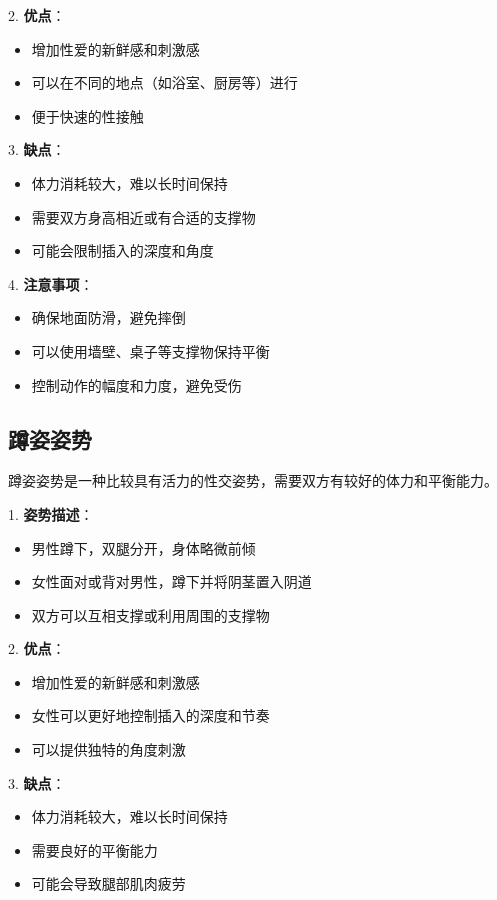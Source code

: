 \documentclass[12pt,UTF8]{ctexbook}
\begin{document}
2. \textbf{优点}：
  \begin{itemize}
  \item 增加性爱的新鲜感和刺激感
  \item 可以在不同的地点（如浴室、厨房等）进行
  \item 便于快速的性接触
  \end{itemize}

3. \textbf{缺点}：
  \begin{itemize}
  \item 体力消耗较大，难以长时间保持
  \item 需要双方身高相近或有合适的支撑物
  \item 可能会限制插入的深度和角度
  \end{itemize}

4. \textbf{注意事项}：
  \begin{itemize}
  \item 确保地面防滑，避免摔倒
  \item 可以使用墙壁、桌子等支撑物保持平衡
  \item 控制动作的幅度和力度，避免受伤
  \end{itemize}

\subsection{蹲姿姿势}

蹲姿姿势是一种比较具有活力的性交姿势，需要双方有较好的体力和平衡能力。

1. \textbf{姿势描述}：
  \begin{itemize}
  \item 男性蹲下，双腿分开，身体略微前倾
  \item 女性面对或背对男性，蹲下并将阴茎置入阴道
  \item 双方可以互相支撑或利用周围的支撑物
  \end{itemize}

2. \textbf{优点}：
  \begin{itemize}
  \item 增加性爱的新鲜感和刺激感
  \item 女性可以更好地控制插入的深度和节奏
  \item 可以提供独特的角度刺激
  \end{itemize}

3. \textbf{缺点}：
  \begin{itemize}
  \item 体力消耗较大，难以长时间保持
  \item 需要良好的平衡能力
  \item 可能会导致腿部肌肉疲劳
  \end{itemize}
\end{document}
